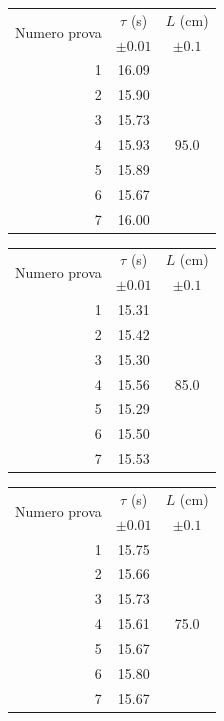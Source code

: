 \documentclass{article}
\begin{document}
\begin{table}[h!]
	\hspace{-0.05\textwidth}
	\begin{minipage}{0.1\textwidth}
		\centering
		\begin{tabular}{ | r | c | c | }
			\hline
			\multirow{2}{5em}{Numero prova}& $ \tau $ (s) & $L$ (cm) \\
			& $\pm 0.01$ & $\pm 0.1$ \\
			\hline
			1 & 16.09 & \multirow{7}{1em}{$95.0$} \\ \cline{1-2}
			2 & 15.90 & \\	\cline{1-2}
			3 & 	15.73 & \\	\cline{1-2}
			4 &	15.93 & \\	\cline{1-2}
			5 &	15.89 & \\	\cline{1-2}
			6 &	15.67 & \\	\cline{1-2}
			7 &	16.00 & \\	\cline{1-2}
			\hline
		\end{tabular}
	\end{minipage}
	\hspace{0.3\textwidth}
	\begin{minipage}{0.1\textwidth}
		\centering
		\begin{tabular}{ | r | c | c | }
    			\hline
    			\multirow{2}{5em}{Numero prova} & $\tau$ (s) & $L$ (cm) \\
    			& $\pm 0.01$ & $\pm 0.1$ \\
    			\hline
    			1 & 15.31 & \multirow{7}{*}{85.0} \\ \cline{1-2}
    			2 & 15.42 & \\ \cline{1-2}
    			3 & 15.30 & \\ \cline{1-2}
    			4 & 15.56 & \\ \cline{1-2}
    			5 & 15.29 & \\ \cline{1-2}
    			6 & 15.50 & \\ \cline{1-2}
    			7 & 15.53 & \\ \cline{1-2}
    			\hline
		\end{tabular}
	\end{minipage}
	\hspace{0.3\textwidth}
	\begin{minipage}{0.1\textwidth}
		\centering
		\begin{tabular}{ | r | c | c | }
    			\hline
    			\multirow{2}{5em}{Numero prova} & $\tau$ (s) & $L$ (cm) \\
    			& $\pm 0.01$ & $\pm 0.1$ \\
    			\hline
    			1 & 15.75 & \multirow{7}{*}{75.0} \\ \cline{1-2}
    			2 & 15.66 & \\ \cline{1-2}
    			3 & 15.73 & \\ \cline{1-2}
    			4 & 15.61 & \\ \cline{1-2}
    			5 & 15.67 & \\ \cline{1-2}
    			6 & 15.80 & \\ \cline{1-2}
    			7 & 15.67 & \\ \cline{1-2}
    			\hline
		\end{tabular}
	\end{minipage}
\end{table}
\end{document}
